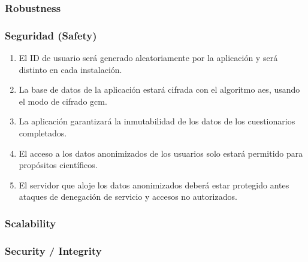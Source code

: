         \subsubsection{Robustness}
        \subsubsection{Seguridad (Safety)}
            \begin{enumerate}[resume, label=\textbf{\texttt{RNF-\arabic*}}]
                \item El ID de usuario será generado aleatoriamente por la aplicación y será distinto en cada instalación.
                \item La base de datos de la aplicación estará cifrada con el algoritmo \gls{aes}, usando el modo de cifrado \gls{gcm}.
                \item La aplicación garantizará la inmutabilidad de los datos de los cuestionarios completados.
                \item El acceso a los datos anonimizados de los usuarios solo estará permitido para propósitos científicos.
                \item El servidor que aloje los datos anonimizados deberá estar protegido antes ataques de denegación de servicio y accesos no autorizados.
            \end{enumerate}
        \subsubsection{Scalability}
        \subsubsection{Security / Integrity}
